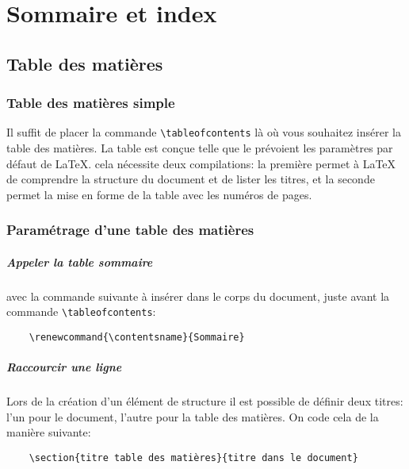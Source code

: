 
\chapter{Sommaire et index}
\section{Table des matières}
\subsection*{Table des matières simple}
Il suffit de placer la commande \verb|\tableofcontents| là où vous souhaitez insérer la table des matières. La table est conçue telle que le prévoient les paramètres par défaut de \LaTeX{}. cela nécessite deux compilations: la première permet à \LaTeX{} de comprendre la structure du document et de lister les titres, et la seconde permet la mise en forme de la table avec les numéros de pages.
\medskip

\subsection*{Paramétrage d'une table des matières}
\paragraph*{Appeler la table \og sommaire\fg{}}
avec la commande suivante à insérer dans le corps du document, juste avant la commande \verb|\tableofcontents|:
\begin{verbatim}
    \renewcommand{\contentsname}{Sommaire}
\end{verbatim}
\medskip

\paragraph*{Raccourcir une ligne}
Lors de la création d'un élément de structure il est possible de définir deux titres: l'un pour le document, l'autre pour la table des matières. On code cela de la manière suivante:
\begin{verbatim}
    \section{titre table des matières}{titre dans le document}
\end{verbatim}
\medskip

